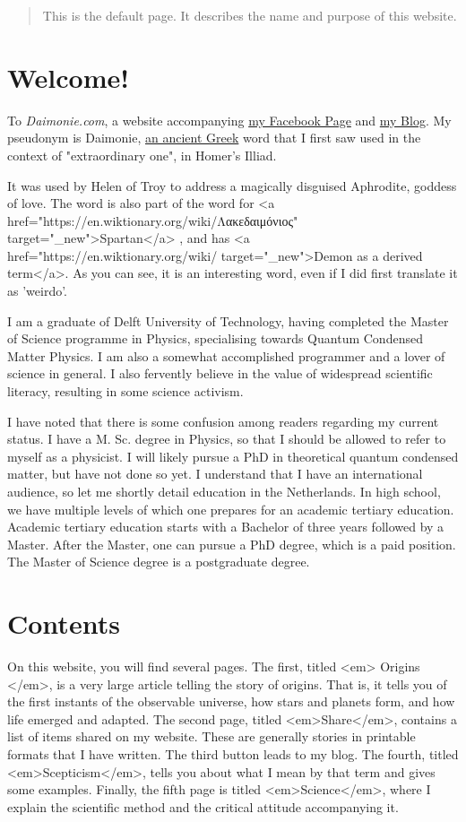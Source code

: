 \begin{abstract}
    This is the default page. It describes the name and purpose of this website.
\end{abstract}

\section{Welcome!} 
To \emph{Daimonie.com}, a website accompanying \href{https://www.facebook.com/daimonie}{my Facebook Page} and
\href{./blog"}{my Blog}. My pseudonym is Daimonie,
\href{https://en.wiktionary.org/wiki/%CE%B4%CE%B1%CE%B9%CE%BC%CF%8C%CE%BD%CE%B9%CE%BF%CF%82}{an ancient Greek} word
that I first saw used in  the context of "extraordinary one", in Homer's Illiad.  


It was used by Helen of Troy to address a magically disguised Aphrodite, goddess of love. The word is also part of the word for
<a href="https://en.wiktionary.org/wiki/Λακεδαιμόνιος" target="_new">Spartan</a> , and has <a href="https://en.wiktionary.org/wiki/%
target="_new">Demon as a derived term</a>. As you can see, it is an interesting word, even if I did first translate it as 'weirdo'.

I am a graduate of Delft University of Technology, having completed the Master of Science programme in Physics, specialising towards
Quantum Condensed Matter Physics. I am also a somewhat accomplished programmer and a lover of science in general. I also fervently believe
in the value of widespread scientific literacy, resulting in some science activism. 

I have noted that there is some confusion among readers regarding my current status. I have a M. Sc. degree in Physics, so that I should be
allowed to refer to myself as a physicist. I will likely pursue a PhD in theoretical quantum condensed matter, but have not done so yet. I understand
that I have an international audience, so let me shortly detail education in the Netherlands. In high school, we have multiple levels of which
one prepares for an academic tertiary education. Academic tertiary education starts with a Bachelor of three years followed by a Master.
After the Master, one can pursue a PhD degree, which is a paid position. The Master of Science degree is a postgraduate degree.
\section{	Contents } 
On this website, you will find several pages. The first, titled <em> Origins </em>, is a very large article telling the story of origins.
That is, it tells you of the first instants of the observable universe, how stars and planets form, and how life emerged and adapted. The
second page, titled <em>Share</em>, contains a list of items shared on my website. These are generally stories in printable formats that I
have written. The third button leads to my blog. The fourth, titled <em>Scepticism</em>, tells you about what I mean by that term and gives
some examples. Finally, the fifth page is titled <em>Science</em>, where I explain the scientific method and the critical attitude accompanying
it.

